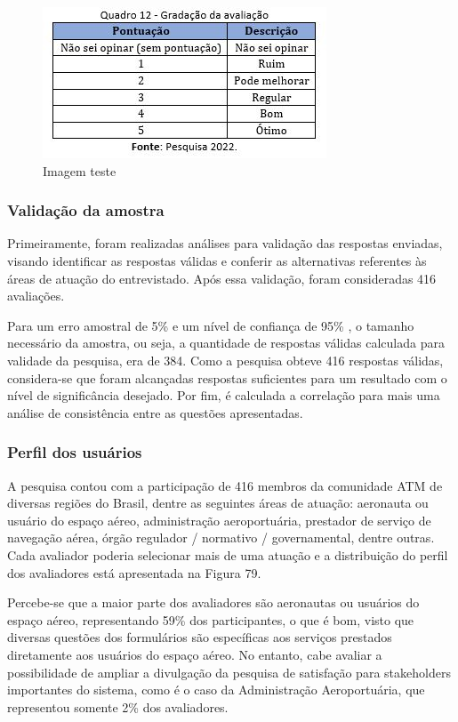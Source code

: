 \documentclass[
]{book}
\begin{document}
\begin{figure}
\centering
\includegraphics{imagens/fig65.jpg}
\caption{Imagem teste}
\end{figure}

\hypertarget{validauxe7uxe3o-da-amostra}{%
\subsubsection{Validação da amostra}\label{validauxe7uxe3o-da-amostra}}

Primeiramente, foram realizadas análises para validação das respostas enviadas, visando identificar as respostas válidas e conferir as alternativas referentes às áreas de atuação do entrevistado. Após essa validação, foram consideradas 416 avaliações.

Para um erro amostral de 5\% e um nível de confiança de 95\% , o tamanho necessário da amostra, ou seja, a quantidade de respostas válidas calculada para validade da pesquisa, era de 384. Como a pesquisa obteve 416 respostas válidas, considera-se que foram alcançadas respostas suficientes para um resultado com o nível de significância desejado. Por fim, é calculada a correlação para mais uma análise de consistência entre as questões apresentadas.

\hypertarget{perfil-dos-usuuxe1rios}{%
\subsubsection{Perfil dos usuários}\label{perfil-dos-usuuxe1rios}}

A pesquisa contou com a participação de 416 membros da comunidade ATM de diversas regiões do Brasil, dentre as seguintes áreas de atuação: aeronauta ou usuário do espaço aéreo, administração aeroportuária, prestador de serviço de navegação aérea, órgão regulador / normativo / governamental, dentre outras. Cada avaliador poderia selecionar mais de uma atuação e a distribuição do perfil dos avaliadores está apresentada na Figura 79.

Percebe-se que a maior parte dos avaliadores são aeronautas ou usuários do espaço aéreo, representando 59\% dos participantes, o que é bom, visto que diversas questões dos formulários são específicas aos serviços prestados diretamente aos usuários do espaço aéreo. No entanto, cabe avaliar a possibilidade de ampliar a divulgação da pesquisa de satisfação para stakeholders importantes do sistema, como é o caso da Administração Aeroportuária, que representou somente 2\% dos avaliadores.
\end{document}
